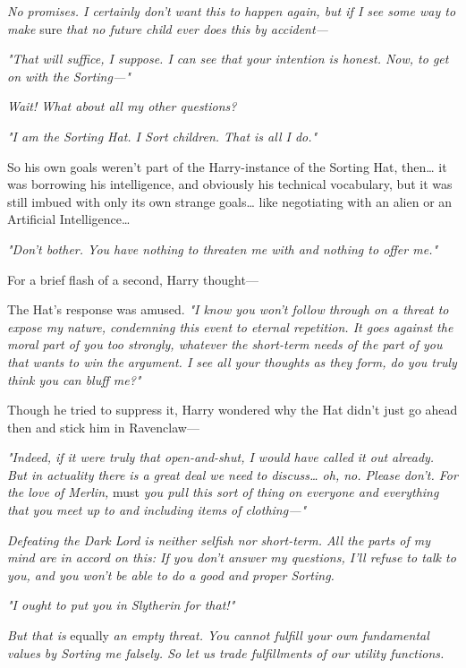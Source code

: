 \emph{No promises. I certainly don't want this to happen again, but if I see 
some way to make} sure\emph{ that no future child ever does this by accident---}

\emph{"That will suffice, I suppose. I can see that your intention is honest. 
Now, to get on with the Sorting---"}

\emph{Wait! What about all my other questions?}

\emph{"I am the Sorting Hat. I Sort children. That is all I do."}

So his own goals weren't part of the Harry-instance of the Sorting Hat, 
then{\ldots} it was borrowing his intelligence, and obviously his technical 
vocabulary, but it was still imbued with only its own strange goals{\ldots} 
like negotiating with an alien or an Artificial Intelligence{\ldots}

\emph{"Don't bother. You have nothing to threaten me with and nothing to offer 
me."}

For a brief flash of a second, Harry thought---

The Hat's response was amused. \emph{"I know you won't follow through on a 
threat to expose my nature, condemning this event to eternal repetition. It 
goes against the moral part of you too strongly, whatever the short-term needs 
of the part of you that wants to win the argument. I see all your thoughts as 
they form, do you truly think you can bluff me?"}

Though he tried to suppress it, Harry wondered why the Hat didn't just go ahead 
then and stick him in Ravenclaw---

\emph{"Indeed, if it were truly that open-and-shut, I would have called it out 
already. But in actuality there is a great deal we need to discuss{\ldots} oh, 
no. Please don't. For the love of Merlin,} must\emph{ you pull this sort of 
thing on everyone and everything that you meet up to and including items of 
clothing---"}

\emph{Defeating the Dark Lord is neither selfish nor short-term. All the parts 
of my mind are in accord on this: If you don't answer my questions, I'll refuse 
to talk to you, and you won't be able to do a good and proper Sorting.}

\emph{"I ought to put you in Slytherin for that!"}

\emph{But that is} equally\emph{ an empty threat. You cannot fulfill your own 
fundamental values by Sorting me falsely. So let us trade fulfillments of our 
utility functions.}

